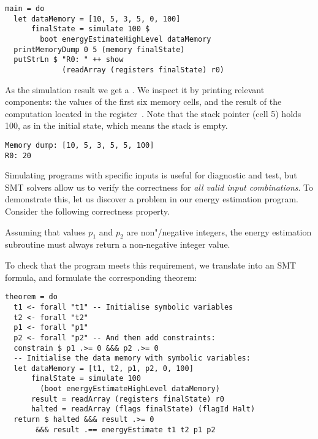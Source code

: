 \begin{verbatim}
main = do
  let dataMemory = [10, 5, 3, 5, 0, 100]
      finalState = simulate 100 $
        boot energyEstimateHighLevel dataMemory
  printMemoryDump 0 5 (memory finalState)
  putStrLn $ "R0: " ++ show
             (readArray (registers finalState) r0)
\end{verbatim}

\noindent
As the simulation result we get a . We inspect it by
printing relevant components: the values of the first six memory cells, and the
result of the computation located in the register~. Note that the stack
pointer (cell 5) holds 100, as in the initial state, which means the stack is empty.

\begin{verbatim}
Memory dump: [10, 5, 3, 5, 5, 100]
R0: 20
\end{verbatim}

Simulating programs with specific inputs is useful for diagnostic and test, but
SMT solvers allow us to verify the correctness for \emph{all valid input
combinations}. To demonstrate this, let us discover a problem in our energy
estimation program. Consider the following correctness property.


\begin{tcolorbox}
Assuming that values $p_1$ and $p_2$ are non"/negative integers, the energy
estimation subroutine must always return a non-negative integer value.
\end{tcolorbox}

To check that the program meets this requirement, we translate
 into an SMT formula,
and formulate the corresponding theorem:

\begin{verbatim}
theorem = do
  t1 <- forall "t1" -- Initialise symbolic variables
  t2 <- forall "t2"
  p1 <- forall "p1"
  p2 <- forall "p2" -- And then add constraints:
  constrain $ p1 .>= 0 &&& p2 .>= 0
  -- Initialise the data memory with symbolic variables:
  let dataMemory = [t1, t2, p1, p2, 0, 100]
      finalState = simulate 100
        (boot energyEstimateHighLevel dataMemory)
      result = readArray (registers finalState) r0
      halted = readArray (flags finalState) (flagId Halt)
  return $ halted &&& result .>= 0
       &&& result .== energyEstimate t1 t2 p1 p2
\end{verbatim}

